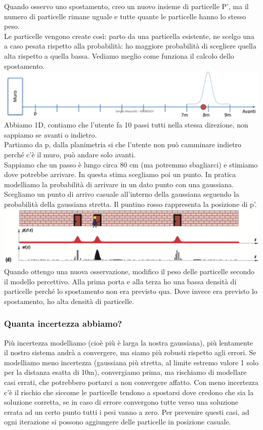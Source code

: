 Quando osservo uno spostamento, creo un nuovo insieme di particelle P', ma il numero di particelle rimane uguale e tutte quante le particelle hanno lo stesso peso. 
\\ Le particelle vengono create così: parto da una particella esistente, ne scelgo una a caso pesata rispetto alla probabilità: ho maggiore probabilità di scegliere quella alta rispetto a quella bassa. 
Vediamo meglio come funziona il calcolo dello spostamento.
\includegraphics[width=\textwidth]{images/MobiDEV/2. tecniche di aggregazione di dati soggetti a rumore/particle filter_2.PNG}
Abbiamo 1D, contiamo che l'utente fa 10 passi tutti nella stessa direzione, non sappiamo se avanti o indietro.
\\ Partiamo da p, dalla planimetria si che l'utente non può camminare indietro perché c'è il muro, può andare solo avanti. 
\\ Sappiamo che un passo è lungo circa 80 cm (ma potremmo sbagliarci) e stimiamo dove potrebbe arrivare. In questa stima scegliamo poi un punto. 
In pratica modelliamo la probabilità di arrivare in un dato punto con una gaussiana. 
\\ Scegliamo un punto di arrivo casuale all'interno della gaussiana seguendo la probabilità della gaussiana stretta. Il puntino rosso rappresenta la posizione di p'.
\includegraphics[width=\textwidth]{images/MobiDEV/2. tecniche di aggregazione di dati soggetti a rumore/particle filter 4.PNG}
Quando ottengo una nuova osservazione, modifico il peso delle particelle secondo il modello percettivo. Alla prima porta e alla terza ho una bassa densità di particelle perché lo spostamento non era previsto qua. 
Dove invece era previsto lo spostamento, ho alta densità di particelle.
 
\subsubsection{Quanta incertezza abbiamo?}
Più incertezza modelliamo (cioè più è larga la nostra gaussiana), più lentamente il nostro sistema andrà a convergere, ma siamo più robusti rispetto agli errori.
Se modelliamo meno incertezza (gaussiana più stretta, al limite estremo valore 1 solo per la distanza esatta di 10m), convergiamo prima, ma rischiamo di modellare casi errati, che potrebbero portarci a 
non convergere affatto.
Con meno incertezza c'è il rischio che siccome le particelle tendono a spostarsi dove credono che sia la soluzione corretta, se in caso di errore convergono tutte verso una soluzione errata ad un certo punto tutti i pesi vanno a zero.
Per prevenire questi casi, ad ogni iterazione si possono aggiungere  delle particelle in posizione casuale.

